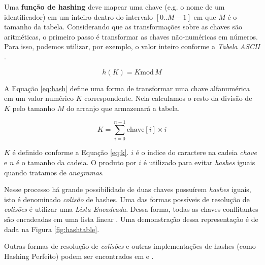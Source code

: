Uma \textbf{função de hashing} deve mapear uma chave (e.g. o nome de um
identificador) em um inteiro dentro do intervalo $[0..M-1]$ em
que $M$ é o tamanho da tabela. Considerando que as transformações sobre
as chaves são aritméticas, o primeiro passo é transformar as chaves
não-numéricas em números. Para isso, podemos utilizar, por exemplo, o valor
inteiro conforme a \emph{Tabela ASCII} \cite{ziviani}.

\begin{equation} \label{eq:hash}
h(K) = K \text{mod} \, M
\end{equation}

A Equação \ref{eq:hash} define uma forma de transformar uma chave alfanumérica
em um valor numérico $K$ correspondente. Nela calculamos o resto da divisão de $K$
pelo tamanho $M$ do arranjo que armazenará a tabela.

\begin{equation} \label{eq:k}
K = \sum_{i=0}^{n-1}\text{chave}[i] \times i
\end{equation}

$K$ é definido conforme a Equação \ref{eq:k}. $i$ é o índice do caractere na
cadeia \emph{chave} e $n$ é o tamanho da cadeia. O produto por $i$ é utilizado
para evitar \emph{hashes} iguais quando tratamos de \emph{anagramas}.

Nesse processo há grande possibilidade de duas chaves possuírem \emph{hashes}
iguais, isto é denominado \emph{colisão} de hashes. Uma das formas possíveis
de resolução de \emph{colisões} é utilizar uma \emph{Lista Encadeada}. Dessa
forma, todas as chaves conflitantes são encadeadas em uma lista linear
\cite{ziviani}. Uma demonstração dessa representação é de dada na Figura
\ref{fig:hashtable}.

Outras formas de resolução de \emph{colisões} e outras implementações de
hashes (como Hashing Perfeito) podem ser encontrados em  e
.

